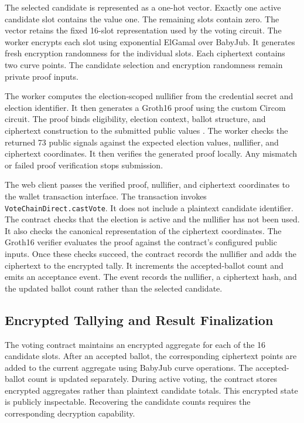 The selected candidate is represented as a one-hot vector. Exactly one
active candidate slot contains the value one. The remaining slots contain
zero. The vector retains the fixed 16-slot representation used by the
voting circuit.
The worker encrypts each slot using exponential ElGamal over BabyJub. It
generates fresh encryption randomness for the individual slots. Each
ciphertext contains two curve points. The candidate selection and encryption
randomness remain private proof inputs.

The worker computes the election-scoped nullifier from the credential secret
and election identifier. It then generates a Groth16 proof using the custom
Circom circuit. The proof binds eligibility, election context, ballot
structure, and ciphertext construction to the submitted public values
\citep{groth2016snark}.
The worker checks the returned 73 public signals against the expected
election values, nullifier, and ciphertext coordinates. It then verifies
the generated proof locally. Any mismatch or failed proof verification
stops submission.

The web client passes the verified proof, nullifier, and ciphertext
coordinates to the wallet transaction interface. The transaction invokes
\texttt{VoteChainDirect.castVote}. It does not include a plaintext candidate
identifier.
The contract checks that the election is active and the nullifier has not
been used. It also checks the canonical representation of the ciphertext
coordinates. The Groth16 verifier evaluates the proof against the
contract's configured public inputs.
Once these checks succeed, the contract records the nullifier and adds the
ciphertext to the encrypted tally. It increments the accepted-ballot count
and emits an acceptance event. The event records the nullifier, a ciphertext
hash, and the updated ballot count rather than the selected candidate.


\subsection{Encrypted Tallying and Result Finalization}
\label{subsec:architecture-finalization}

The voting contract maintains an encrypted aggregate for each of the 16
candidate slots. After an accepted ballot, the corresponding ciphertext
points are added to the current aggregate using BabyJub curve operations.
The accepted-ballot count is updated separately.
During active voting, the contract stores encrypted aggregates rather than
plaintext candidate totals. This encrypted state is publicly inspectable.
Recovering the candidate counts requires the corresponding decryption
capability.

